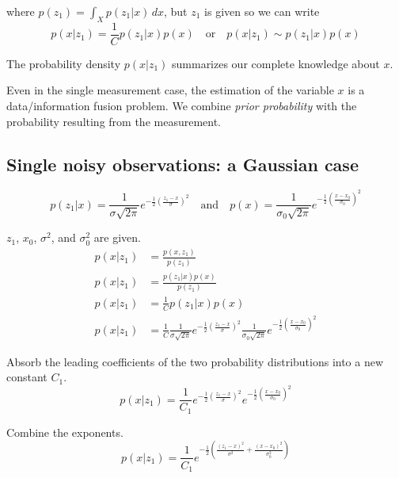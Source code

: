 where $p(z_1) = \int_X p(z_1|x) \,dx$, but $z_1$ is given so we can write
\begin{equation*}
  p(x|z_1) = \frac{1}{C} p(z_1|x) p(x) \quad \text{or} \quad
    p(x|z_1) \sim p(z_1|x) p(x)
\end{equation*}

The probability density $p(x|z_1)$ summarizes our complete knowledge about $x$.
\begin{remark}
  Even in the single measurement case, the estimation of the variable $x$ is a
  data/information fusion problem. We combine \textit{prior probability} with
  the probability resulting from the measurement.
\end{remark}

\subsection{Single noisy observations: a Gaussian case}
\begin{equation*}
  p(z_1|x) = \frac{1}{\sigma \sqrt{2\pi}} e^{-\frac{1}{2}
    \left(\frac{z_1 - x}{\sigma}\right)^2}
  \quad \text{and} \quad
  p(x) = \frac{1}{\sigma_0 \sqrt{2\pi}} e^{-\frac{1}{2}
    \left(\frac{x - x_0}{\sigma_0}\right)^2}
\end{equation*}

$z_1$, $x_0$, $\sigma^2$, and $\sigma_0^2$ are given.
\begin{align*}
  p(x|z_1) &= \frac{p(x, z_1)}{p(z_1)} \\
  p(x|z_1) &= \frac{p(z_1|x) p(x)}{p(z_1)} \\
  p(x|z_1) &= \frac{1}{C} p(z_1|x) p(x) \\
  p(x|z_1) &= \frac{1}{C}
    \frac{1}{\sigma \sqrt{2\pi}} e^{-\frac{1}{2}
      \left(\frac{z_1 - x}{\sigma}\right)^2}
    \frac{1}{\sigma_0 \sqrt{2\pi}} e^{-\frac{1}{2}
      \left(\frac{x - x_0}{\sigma_0}\right)^2}
\end{align*}

Absorb the leading coefficients of the two probability distributions into a new
constant $C_1$.
\begin{equation*}
  p(x|z_1) = \frac{1}{C_1}
    e^{-\frac{1}{2} \left(\frac{z_1 - x}{\sigma}\right)^2}
    e^{-\frac{1}{2} \left(\frac{x - x_0}{\sigma_0}\right)^2}
\end{equation*}

Combine the exponents.
\begin{equation*}
  p(x|z_1) = \frac{1}{C_1} e^{-\frac{1}{2} \left(
      \frac{(z_1 - x)^2}{\sigma^2} + \frac{(x - x_0)^2}{\sigma_0^2}
    \right)}
\end{equation*}

